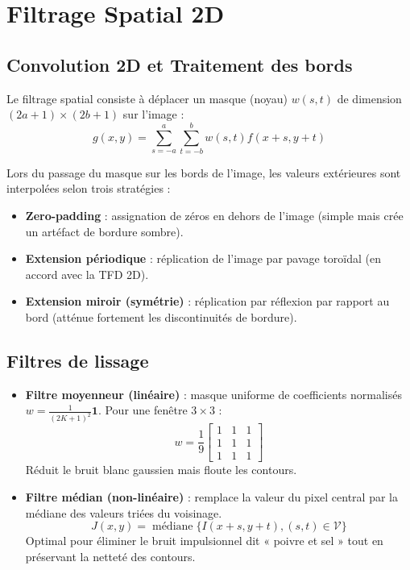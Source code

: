 
\section{Filtrage Spatial 2D}

\subsection{Convolution 2D et Traitement des bords}

Le filtrage spatial consiste à déplacer un masque (noyau) $w(s,t)$ de dimension $(2a+1) \times (2b+1)$ sur l'image :
\begin{equation}
    g(x,y) = \sum_{s=-a}^a \sum_{t=-b}^b w(s,t) f(x+s, y+t)
\end{equation}

\begin{prop}
    Lors du passage du masque sur les bords de l'image, les valeurs extérieures sont interpolées selon trois stratégies :
    \begin{itemize}
        \item \textbf{Zero-padding} : assignation de zéros en dehors de l'image (simple mais crée un artéfact de bordure sombre).
        \item \textbf{Extension périodique} : réplication de l'image par pavage toroïdal (en accord avec la TFD 2D).
        \item \textbf{Extension miroir (symétrie)} : réplication par réflexion par rapport au bord (atténue fortement les discontinuités de bordure).
    \end{itemize}
\end{prop}

\subsection{Filtres de lissage}

\begin{itemize}
    \item \textbf{Filtre moyenneur (linéaire)} : masque uniforme de coefficients normalisés $w = \frac{1}{(2K+1)^2} \mathbf{1}$. Pour une fenêtre $3 \times 3$ :
        $$ w = \frac{1}{9} \begin{bmatrix} 1 & 1 & 1 \\ 1 & 1 & 1 \\ 1 & 1 & 1 \end{bmatrix} $$
        Réduit le bruit blanc gaussien mais floute les contours.
    \item \textbf{Filtre médian (non-linéaire)} : remplace la valeur du pixel central par la médiane des valeurs triées du voisinage.
        \begin{equation}
            J(x,y) = \operatorname{médiane}\{ I(x+s, y+t), (s,t) \in \mathcal{V} \}
        \end{equation}
        Optimal pour éliminer le bruit impulsionnel dit « poivre et sel » tout en préservant la netteté des contours.
\end{itemize}

